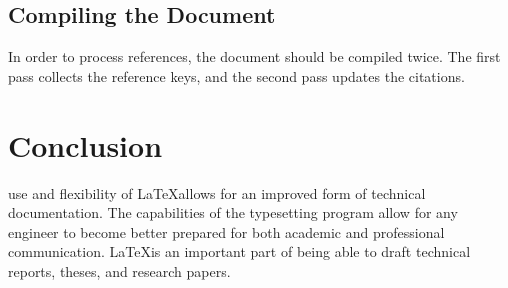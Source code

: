 \documentclass[12pt,journal,compsoc]{IEEEtran}
\begin{document}
\subsection{Compiling the Document}
In order to process references, the document should be compiled twice. The first pass collects the reference keys, and the second pass updates the citations.

\section{Conclusion}

 use and flexibility of \LaTeX allows for an improved form of technical documentation. The capabilities of the typesetting program allow for any engineer to become better prepared for both academic and professional communication. \LaTeX is an important part of being able to draft technical reports, theses, and research papers. 
\end{document}
